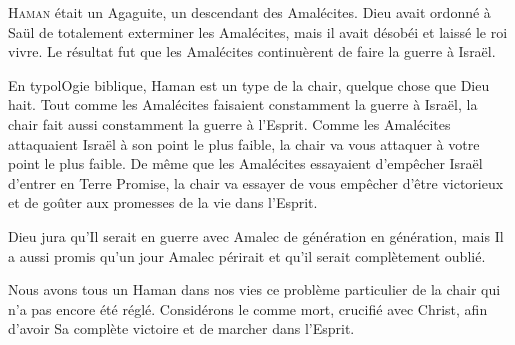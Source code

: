 \lettrine{H}{aman} était un Agaguite, un descendant des Amalécites.
 Dieu avait ordonné à Saül de totalement exterminer les Amalécites,
 mais il avait désobéi et laissé le roi vivre.
 Le résultat fut que les Amalécites continuèrent de faire la guerre à Israël.

En typolOgie
 biblique, Haman est un type de la chair,
 quelque chose que Dieu hait.
 Tout comme les Amalécites faisaient constamment la guerre à Israël,
 la chair fait aussi constamment la guerre à l'Esprit.
 Comme les Amalécites attaquaient Israël à son point le plus faible,
 la chair va vous attaquer à votre point le plus faible.
 De même que les Amalécites essayaient d'empêcher Israël
 d'entrer en Terre Promise, la chair va essayer de vous empêcher
 d'être victorieux et de goûter aux promesses de la vie dans l'Esprit.

Dieu jura qu'Il serait en guerre avec Amalec de génération en génération,
 mais Il a aussi promis qu'un jour Amalec périrait et
 qu'il serait complètement oublié.


Nous avons tous un Haman dans nos vies
 \ocadr{}ce problème particulier de la chair
 qui n'a pas encore été réglé.
 Considérons le comme mort, crucifié avec Christ,
 afin d'avoir Sa complète victoire et de marcher dans l'Esprit.

\dvrule








